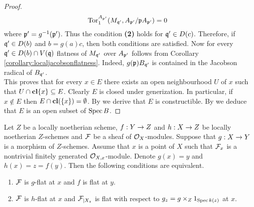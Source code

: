 \begin{proof}
$$\mathrm{Tor}_1^{A_{\mathfrak{p}'}}(M_{\mathfrak{q}'},A_{\mathfrak{p}'}/\mathfrak{p}A_{\mathfrak{p}'})=0$$
where $\mathfrak{p}'=g^{-1}(\mathfrak{p}')$. Thus the condition \textbf{(2)} holds for $\mathfrak{q}'\in D(c)$. Therefore, if $\mathfrak{q}'\in D(b)$ and $b=g(a)c$, then both conditions are satisfied. Now for every $\mathfrak{q}'\in D(b)\cap V(\mathfrak{q})$ flatness of $M_{\mathfrak{q}'}$ over $A_{\mathfrak{p}'}$ follows from Corollary \ref{corollary:localjacobsonflatness}. Indeed, $g(\mathfrak{p})B_{\mathfrak{q}'}$ is contained in the Jacobson radical of $B_{\mathfrak{q}'}$.\\
This proves that for every $x\in E$ there exists an open neighbourhood $U$ of $x$ such that $U\cap \mathbf{cl}\{x\}\subseteq E$. Clearly $E$ is closed under generization. In particular, if $x\not \in E$ then $E\cap \mathbf{cl}(\{x\}) = \emptyset$. By {\cite[Proposition 1.7]{Constructibleandlocallyconstructiblesets}} we derive that $E$ is constructible. By {\cite[Corollary 4.6]{Proconstructiblesets}} we deduce that $E$ is an open subset of $\mathrm{Spec}\, B$.
\end{proof}
\begin{theorem}
Let $Z$ be a locally noetherian scheme, $f:Y\rightarrow Z$ and $h:X\rightarrow Z$ be locally noetherian $Z$-schemes and ${\mathcal F}$ be a sheaf of ${\mathcal O}_X$-modules. Suppose that $g:X\rightarrow Y$ is a morphism of $Z$-schemes. Assume that $x$ is a point of $X$ such that ${\mathcal F}_x$ is a nontrivial finitely generated ${\mathcal O}_{X,x}$-module. Denote $g(x)=y$ and $h(x)=z=f(y)$. Then the following conditions are equivalent.
\begin{enumerate}[label=\emph{\textbf{(\arabic*)}}, leftmargin=*]
\item ${\mathcal F}$ is $g$-flat at $x$ and $f$ is flat at $y$.
\item ${\mathcal F}$ is $h$-flat at $x$ and ${\mathcal F}_{\mid X_z}$ is flat with respect to $g_z=g\times_Z1_{\mathrm{Spec}\, k(z)}$ at $x$.
\end{enumerate}
\end{theorem}
